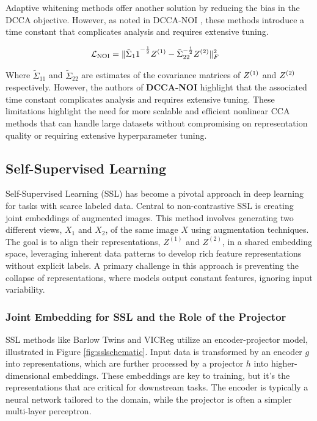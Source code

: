 Adaptive whitening methods \citep{wang2015stochastic, chang2018scalable} offer another solution by reducing the bias in the DCCA objective. However, as noted in DCCA-NOI \citep{wang2015unsupervised}, these methods introduce a time constant that complicates analysis and requires extensive tuning.

\begin{align}
    \mathcal{L}_\text{NOI} &= \|{\tilde{\Sigma}_11}^{-\frac{1}{2}} Z^{(1)}-{\tilde{\Sigma}_{22}}^{-\frac{1}{2}} Z^{(2)}\|^2_F
\end{align}

Where $\tilde{\Sigma}_{11}$ and $\tilde{\Sigma}_{22}$ are estimates of the covariance matrices of $Z^{(1)}$ and $Z^{(2)}$ respectively.
However, the authors of \textbf{DCCA-NOI} highlight that the associated time constant complicates analysis and requires extensive tuning.
These limitations highlight the need for more scalable and efficient nonlinear CCA methods that can handle large datasets without compromising on representation quality or requiring extensive hyperparameter tuning.
\subsection{Self-Supervised Learning}

Self-Supervised Learning (SSL) has become a pivotal approach in deep learning for tasks with scarce labeled data. Central to non-contrastive SSL is creating joint embeddings of augmented images. This method involves generating two different views, \( X_1 \) and \( X_2 \), of the same image \( X \) using augmentation techniques. The goal is to align their representations, \( Z^{(1)} \) and \( Z^{(2)} \), in a shared embedding space, leveraging inherent data patterns to develop rich feature representations without explicit labels. A primary challenge in this approach is preventing the collapse of representations, where models output constant features, ignoring input variability.

\subsubsection{Joint Embedding for SSL and the Role of the Projector}
SSL methods like Barlow Twins and VICReg utilize an encoder-projector model, illustrated in Figure \ref{fig:sslschematic}. Input data is transformed by an encoder \( g \) into representations, which are further processed by a projector \( h \) into higher-dimensional embeddings. These embeddings are key to training, but it's the representations that are critical for downstream tasks. The encoder is typically a neural network tailored to the domain, while the projector is often a simpler multi-layer perceptron.

